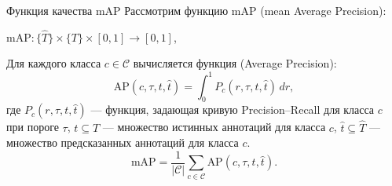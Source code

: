 \documentclass{beamer}
\begin{document}





\begin{frame}{Функция качества $\text{mAP}$}
Рассмотрим функцию $\text{mAP}$ (mean Average Precision):
\begin{center}
   $\text{mAP}: \{ \hat{T} \}  \times \{ T \} \times [0,1] \to [0,1]$,
\end{center}



Для каждого класса \(c \in \mathcal{C}\) вычисляется функция  (Average Precision):
\[
\text{AP}(c, \tau, t, \hat{t}) = \int_{0}^{1} P_c(r, \tau, t, \hat{t}) \, dr,
\]
где \(P_c(r, \tau, t, \hat{t})\) --- функция, задающая кривую Precision–Recall для класса \(c\) при пороге $\tau$, $t \subseteq T$ — множество истинных аннотаций для класса \(c\), $\hat{t} \subseteq \hat{T}$ — множество предсказанных аннотаций для класса \(c\).
\[
\text{mAP} = \frac{1}{|\mathcal{C}|} \sum_{c \in \mathcal{C}} \text{AP}(c, \tau, t, \hat{t}).
\]

\end{frame}
\end{document}
